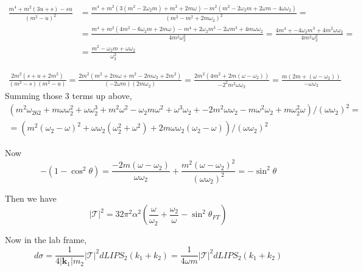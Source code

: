 \documentclass[twoside]{amsart}
\begin{document}
\begin{itemize}
\[
\begin{aligned}
  \frac{ m^4 + m^2 ( 3 u + s ) - su }{ (m^2 - u)^2 } & = \frac{ m^4 + m^2 ( 3 ( m^2 - 2 \omega_2 m ) + m^2 + 2 m \omega )  - m^2 ( m^2 - 2 \omega_2 m + 2 \omega m - 4 \omega \omega_2 ) }{ ( m^2 - m^2 + 2 m \omega_2)^2 } = \\ 
  & = \frac{ m^4 + m^2 ( 4 m^2 - 6 \omega_2 m + 2 m \omega) - m^4 + 2 \omega_2 m^3 - 2 \omega m^3 + 4 m \omega \omega_2  }{ 4 m^2 \omega_2^2 } = \frac{ 4 m^4 + -4 \omega_2 m^3 + 4 m^2 \omega \omega_2 }{ 4 m^2 \omega_2^2 } = \\
  & = \frac{ m^2 - \omega_2 m + \omega \omega_2 }{ \omega_2^2 } 
\end{aligned}
\]
\end{itemize}

\[
\begin{aligned}
  \frac{ 2 m^2 ( s + u + 2 m^2 ) }{ (m^2 - s) (m^2 - u ) } = \frac{ 2 m^2 ( m^2 + 2 m \omega + m^2-  2 m \omega_2 + 2m^2 ) }{ ( -2 \omega m ) (2 m \omega_2 ) } = \frac{ 2 m^2 ( 4 m^2 + 2 m ( \omega- \omega_2 )  ) }{ -2^2 m^2 \omega \omega_2  }  = \frac{ m (2m + (\omega - \omega_2)) }{ - \omega \omega_2  } 
\end{aligned}
\]
Summing those 3 terms up above,
\[
\begin{gathered}
  ( m^2 \omega_262 + m\omega \omega_2^2 + \omega \omega_2^3 + m^2 \omega^2 - \omega_2 m \omega^2 + \omega^3 \omega_2 + - 2 m^2 \omega \omega_2 - m \omega^2 \omega_2 + m \omega_2^2 \omega )/ ( \omega \omega_2)^2  = \\
  = ( m^2 ( \omega_2 - \omega)^2 + \omega \omega_2 (\omega_2^2 + \omega^2 ) + 2 m \omega \omega_2 ( \omega_2 - \omega) )/ ( \omega \omega_2)^2 
\end{gathered}
\]

Now 
\[
-(1 - \cos^2{\theta} ) = \frac{ -2 m ( \omega - \omega_2) }{ \omega \omega_2} + \frac{ m^2 ( \omega - \omega_2)^2 }{ ( \omega \omega_2)^2 } = -\sin^2{\theta}
\]

Then we have
\[
|\mathcal{T}|^2 = 32 \pi^2 \alpha^2 \left( \frac{ \omega }{ \omega_2 } + \frac{ \omega_2}{ \omega } - \sin^2{\theta_{FT} } \right)
\]

Now in the lab frame, 
\[
d\sigma = \frac{ 1 }{ 4 | \mathbf{k}_1 | m_2 } | \mathcal{T} |^2 dLIPS_2(k_1 + k_2) = \frac{1}{ 4 \omega m } | \mathcal{T} |^2 dLIPS_2(k_1 + k_2) 
\]
\end{document}
